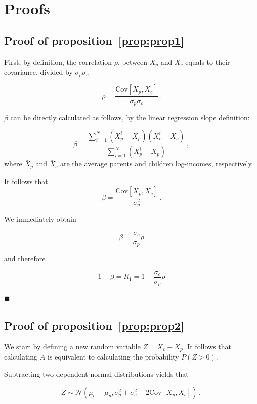 \documentclass[12pt,a4paper]{article}
\newcommand*{\qed}{\hfill\ensuremath{\blacksquare}}%
\newcommand{\preflong}[1]{proposition~\ref{prop:#1}}
\newcommand{\be}{\begin{equation}}
\newcommand{\ee}{\end{equation}}
\numberwithin{equation}{section}
\begin{document}
\clearpage

\doublespacing


\clearpage


\appendix

\section{Proofs}
\label{app:appA}

\subsection{Proof of \preflong{prop1}}

First, by definition, the correlation $\rho$, between $X_p$ and $X_c$ equals to their covariance, divided by $\sigma_p\sigma_c$

\be
\rho = \frac{\text{Cov}\left[X_p,X_c\right]}{\sigma_p\sigma_c}\,.
\ee

$\beta$ can be directly calculated as follows, by the linear regression slope definition:

\be
\beta = \frac{\sum_{i=1}^{N} {\left(X_p^i - \bar{X}_p\right)\left(X_c^i - \bar{X}_c\right)}}{\sum_{i=1}^{N} {\left(X_p^i - \bar{X}_p\right)}}\,,
\ee
where $\bar{X}_p$ and $\bar{X}_c$ are the average parents and children log-incomes, respectively.

It follows that 
\be
\beta = \frac{\text{Cov}\left[X_p,X_c\right]}{\sigma_p^2}\,.
\ee

We immediately obtain

\be
\beta = \frac{\sigma_c}{\sigma_p}\rho
\ee

and therefore

\be
1-\beta = R_1 = 1-\frac{\sigma_c}{\sigma_p}\rho
\ee

\qed

\subsection{Proof of \preflong{prop2}}

We start by defining a new random variable $Z = X_c-X_p$. It follows that calculating $A$ is equivalent to calculating the probability $P\left(Z>0\right)$.

Subtracting two dependent normal distributions yields that

\be
Z \sim \mathcal{N}\left(\mu_c - \mu_p,\sigma_p^2 + \sigma_c^2 - 2\text{Cov}\left[X_p,X_c\right]\right)\,,
\ee
\end{document}
